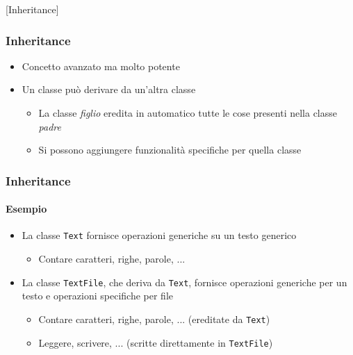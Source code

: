 [Inheritance]

\begin{contentframe}
    \frametitle{Inheritance}

    \begin{itemize}
        \item Concetto avanzato ma molto potente

        \bigskip
        \item Un classe può derivare da un'altra classe
        \begin{itemize}
            \item La classe \textit{figlio} eredita in automatico tutte le cose presenti nella classe \textit{padre}
            \item Si possono aggiungere funzionalità specifiche per quella classe
        \end{itemize}
    \end{itemize}
\end{contentframe}

\begin{exampleframe}
    \frametitle{Inheritance}
    \framesubtitle{Esempio}

    \begin{itemize}
        \item La classe \texttt{Text} fornisce operazioni generiche su un testo generico
        \begin{itemize}
            \item Contare caratteri, righe, parole, ...
        \end{itemize}

        \bigskip
        \item La classe \texttt{TextFile}, che deriva da \texttt{Text}, fornisce operazioni generiche per un testo e operazioni specifiche per file
        \begin{itemize}
            \item Contare caratteri, righe, parole, ... (ereditate da \texttt{Text})
            \item Leggere, scrivere, ... (scritte direttamente in \texttt{TextFile})
        \end{itemize}
    \end{itemize}
\end{exampleframe}

